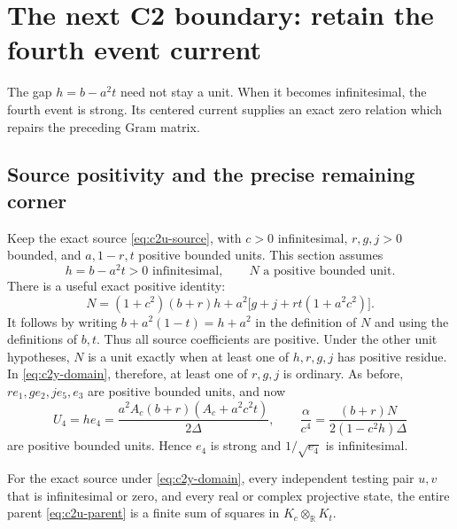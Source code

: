 \section{The next C2 boundary: retain the fourth event current}
\label{sec:c2-y-current}

The gap $h=b-a^2t$ need not stay a unit.  When it becomes
infinitesimal, the fourth event is strong.  Its centered current supplies
an exact zero relation which repairs the preceding Gram matrix.

\subsection{Source positivity and the precise remaining corner}
Keep the exact source \eqref{eq:c2u-source}, with $c>0$ infinitesimal,
$r,g,j>0$ bounded, and $a,1-r,t$ positive bounded units.  This section
assumes
\begin{equation}
h=b-a^2t>0\text{ infinitesimal},\qquad N\text{ a positive bounded unit}.
\label{eq:c2y-domain}
\end{equation}
There is a useful exact positive identity:
\begin{equation}
N=(1+c^2)(b+r)h+a^2\bigl[g+j+rt(1+a^2c^2)\bigr].
\label{eq:c2y-N-positive}
\end{equation}
It follows by writing $b+a^2(1-t)=h+a^2$ in the definition of $N$
and using the definitions of $b,t$.  Thus all source coefficients are
positive.  Under the other unit hypotheses, $N$ is a unit exactly when
at least one of $h,r,g,j$ has positive residue.  In
\eqref{eq:c2y-domain}, therefore, at least one of $r,g,j$ is ordinary.
As before, $re_1,ge_2,je_5,e_3$ are positive bounded units, and now
\begin{equation}
U_4=he_4=\frac{a^2A_c(b+r)(A_c+a^2c^2t)}{2\Delta},\qquad
\frac{\alpha}{c^4}=\frac{(b+r)N}{2(1-c^2h)\Delta}
\label{eq:c2y-units}
\end{equation}
are positive bounded units.  Hence $e_4$ is strong and
$1/\sqrt{e_4}$ is infinitesimal.

\begin{theorem}
\label{thm:c2-y-current}
For the exact source under \eqref{eq:c2y-domain}, every independent
testing pair $u,v$ that is infinitesimal or zero, and every real or
complex projective state, the entire parent \eqref{eq:c2u-parent} is a
finite sum of squares in $K_c\otimes_{\mathbb R}K_t$.
\end{theorem}

